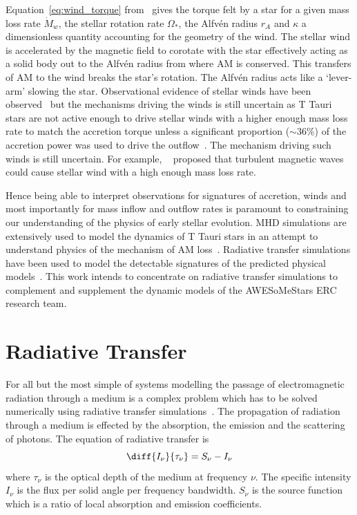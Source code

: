 \documentclass[fleqn,usenatbib]{mnras}
\begin{document}
Equation~\ref{eq:wind_torque} from~\citep{2005ApJ...632L.135M} gives the torque felt by a star for a given mass loss rate $\dot{M}_{w}$, the stellar rotation rate $\Omega_{\ast}$, the Alfv\'en radius $r_A$ and $\kappa$ a dimensionless quantity accounting for the geometry of the wind. The stellar wind is accelerated by the magnetic field to corotate with the star effectively acting as a solid body out to the Alfv\'en radius from where AM is conserved. This transfers of AM to the wind breaks the star's rotation. The Alfv\'en radius acts like a `lever-arm' slowing the star. Observational evidence of stellar winds have been observed~\citep[e.g.][]{2003ApJ...599L..41E,2006ApJ...646..319E} but the mechanisms driving the winds is still uncertain as T Tauri stars are not active enough to drive stellar winds with a higher enough mass loss rate to match the accretion torque unless a significant proportion ($\sim 36\%$) of the accretion power was used to drive the outflow~\citep{2009A&A...508.1117Z,Matt:2008ic}. The mechanism driving such winds is still uncertain. For example, ~\citet{2008ApJ...689..316C} proposed that turbulent magnetic waves could cause stellar wind with a high enough mass loss rate.


Hence being able to interpret observations for signatures of accretion, winds and most importantly for mass inflow and outflow rates is paramount to constraining our understanding of the physics of early stellar evolution. MHD simulations are extensively used to model the dynamics of T Tauri stars in an attempt to understand physics of the mechanism of AM loss~\citep[e.g.][]{2009A&A...508.1117Z,Matt:2008bj,2019A&A...624A..31C,Romanova:2002hc}. Radiative transfer simulations have been used to model the detectable signatures of the predicted physical models~\citep[e.g.][]{Esau:2014is,2012MNRAS.426.2901K,Kurosawa:2011fh,1998AJ....116..455M,Hartmann:1994tl}. This work intends to concentrate on radiative transfer simulations to complement and supplement the dynamic models of the AWESoMeStars ERC research team.

\section{Radiative Transfer}
\label{sec:radiative}
For all but the most simple of systems modelling the passage of electromagnetic radiation through a medium is a complex problem which has to be solved numerically using radiative transfer simulations~\citep[see][]{2013ARA&A..51...63S}. The propagation of radiation through a medium is effected by the absorption, the emission and the scattering of photons. The equation of radiative transfer is
\begin{equation}
    \diff{I_{\nu}}{\tau_{\nu}} = S_{\nu} - I_{\nu}
\label{eq:RT}
\end{equation}
where $\tau_{\nu}$ is the optical depth of the medium at frequency $\nu$. The specific intensity $I_{\nu}$ is the flux per solid angle per frequency bandwidth. $S_{\nu}$ is the source function which is a ratio of local absorption and emission coefficients.
\end{document}
